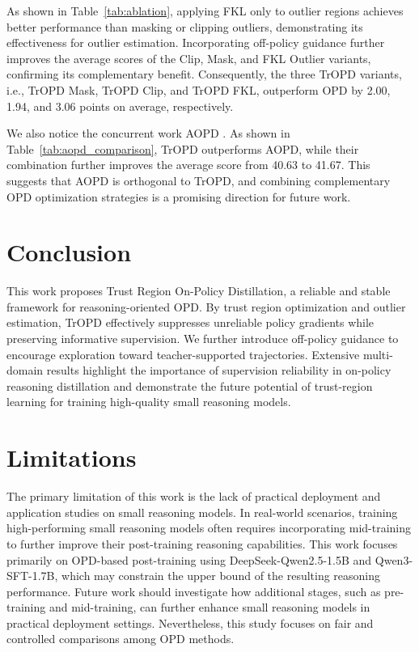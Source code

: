 \documentclass{llmxive}
\providecommand{\cite}[1]{\citep{#1}}
\begin{document}
As shown in Table~\ref{tab:ablation}, applying FKL only to outlier regions achieves better performance than masking or clipping outliers, demonstrating its effectiveness for outlier estimation. Incorporating off-policy guidance further improves the average scores of the Clip, Mask, and FKL Outlier variants, confirming its complementary benefit. Consequently, the three TrOPD variants, i.e., TrOPD Mask, TrOPD Clip, and TrOPD FKL, outperform OPD by 2.00, 1.94, and 3.06 points on average, respectively.

We also notice the concurrent work AOPD \cite{jia2026asymmetric}. As shown in Table~\ref{tab:aopd_comparison}, TrOPD outperforms AOPD, while their combination further improves the average score from 40.63 to 41.67. This suggests that AOPD is orthogonal to TrOPD, and combining complementary OPD optimization strategies is a promising direction for future work.





\section{Conclusion}
This work proposes Trust Region On-Policy Distillation, a reliable and stable framework for reasoning-oriented OPD. By trust region optimization and outlier estimation, TrOPD effectively suppresses unreliable policy gradients while preserving informative supervision. 
We further introduce off-policy guidance to encourage exploration toward teacher-supported trajectories. 
Extensive multi-domain results highlight the importance of supervision reliability in on-policy reasoning distillation and demonstrate the future potential of trust-region learning for training high-quality small reasoning models.

\section*{Limitations}

The primary limitation of this work is the lack of practical deployment and application studies on small reasoning models. In real-world scenarios, training high-performing small reasoning models often requires incorporating mid-training to further improve their post-training reasoning capabilities. This work focuses primarily on OPD-based post-training using DeepSeek-Qwen2.5-1.5B and Qwen3-SFT-1.7B, which may constrain the upper bound of the resulting reasoning performance. Future work should investigate how additional stages, such as pre-training and mid-training, can further enhance small reasoning models in practical deployment settings. Nevertheless, this study focuses on fair and controlled comparisons among OPD methods.
\end{document}
